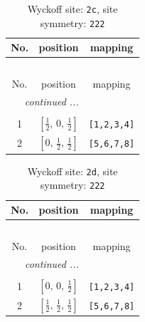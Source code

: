 \documentclass[fleqn,8pt]{jsarticle}
\begin{document}
\begin{longtable}{ccc}
\caption{Wyckoff site: {\tt 2c}, site symmetry: {\tt 222}}
 \\
 \hline \hline
No. & position & mapping \\ \hline \endfirsthead

\multicolumn{2}{l}{\tablename\ \thetable{}} \\
 \hline \hline
No. & position & mapping \\ \hline \endhead

 \hline \hline
\multicolumn{2}{r}{\footnotesize\it continued ...} \\ \endfoot

 \hline \hline
\multicolumn{2}{r}{} \\ \endlastfoot

1 & $\left[ \frac{1}{2},\, 0,\, \frac{1}{2} \right]$ & {\tt [1,2,3,4]} \\ \hline
2 & $\left[ 0,\, \frac{1}{2},\, \frac{1}{2} \right]$ & {\tt [5,6,7,8]} \\
\end{longtable}
\renewcommand{\arraystretch}{1.2}
\begin{longtable}{ccc}
\caption{Wyckoff site: {\tt 2d}, site symmetry: {\tt 222}}
 \\
 \hline \hline
No. & position & mapping \\ \hline \endfirsthead

\multicolumn{2}{l}{\tablename\ \thetable{}} \\
 \hline \hline
No. & position & mapping \\ \hline \endhead

 \hline \hline
\multicolumn{2}{r}{\footnotesize\it continued ...} \\ \endfoot

 \hline \hline
\multicolumn{2}{r}{} \\ \endlastfoot

1 & $\left[ 0,\, 0,\, \frac{1}{2} \right]$ & {\tt [1,2,3,4]} \\ \hline
2 & $\left[ \frac{1}{2},\, \frac{1}{2},\, \frac{1}{2} \right]$ & {\tt [5,6,7,8]} \\
\end{longtable}
\renewcommand{\arraystretch}{1.2}
\end{document}
